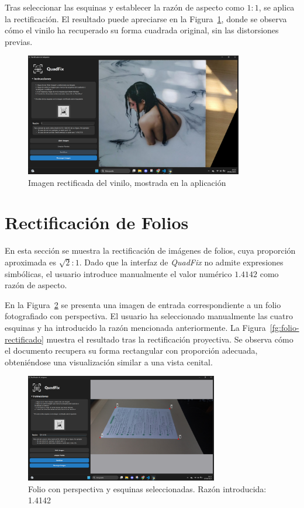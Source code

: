 Tras seleccionar las esquinas y establecer la razón de aspecto como $1:1$, se aplica la rectificación. El resultado puede apreciarse en la Figura~\ref{fg:vinilo-rectificado}, donde se observa cómo el vinilo ha recuperado su forma cuadrada original, sin las distorsiones previas.

\begin{figure}[H]
    \centering
    \includegraphics[width=0.85\textwidth]{figures/4.Examples/Cuadrado/Vinilo2.png}
    \caption{Imagen rectificada del vinilo, mostrada en la aplicación}
    \label{fg:vinilo-rectificado}
\end{figure}




\section{Rectificación de Folios}

En esta sección se muestra la rectificación de imágenes de folios, cuya proporción aproximada es $\sqrt{2}:1$. Dado que la interfaz de \textit{QuadFix} no admite expresiones simbólicas, el usuario introduce manualmente el valor numérico $1.4142$ como razón de aspecto.

En la Figura~\ref{fg:folio-original} se presenta una imagen de entrada correspondiente a un folio fotografiado con perspectiva. El usuario ha seleccionado manualmente las cuatro esquinas y ha introducido la razón mencionada anteriormente. La Figura~\ref{fg:folio-rectificado} muestra el resultado tras la rectificación proyectiva. Se observa cómo el documento recupera su forma rectangular con proporción adecuada, obteniéndose una visualización similar a una vista cenital.

\begin{figure}[H]
    \centering
    \includegraphics[width=0.75\textwidth]{figures/4.Examples/A4/Example1.png}
    \caption{Folio con perspectiva y esquinas seleccionadas. Razón introducida: 1.4142}
    \label{fg:folio-original}
\end{figure}

